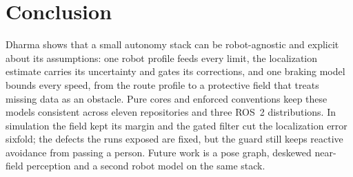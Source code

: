\section{Conclusion}
\label{sec:conclusion}

Dharma shows that a small autonomy stack can be robot-agnostic and explicit about its
assumptions: one robot profile feeds every limit, the localization estimate carries its
uncertainty and gates its corrections, and one braking model bounds every speed, from the route
profile to a protective field that treats missing data as an obstacle. Pure cores and enforced
conventions keep these models consistent across eleven repositories and three ROS~2
distributions. In simulation the field kept its margin and the gated filter cut the
localization error sixfold; the defects the runs exposed are fixed, but the guard still keeps
reactive avoidance from passing a person. Future work is a pose graph, deskewed near-field
perception and a second robot model on the same stack.
